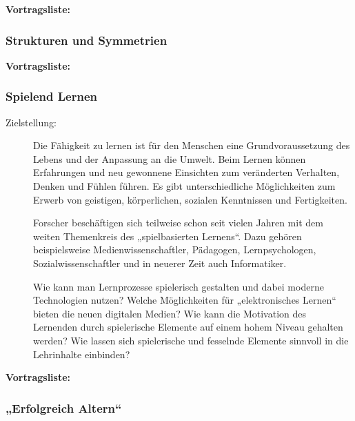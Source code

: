 \documentclass[%
a4paper, %
11pt,               %
leqno,              %
fleqn,              %
]
{scrartcl}
\begin{document}
\textsf{\textbf{Vortragsliste:}}


\subsubsection{Strukturen und Symmetrien} %
\label{ssub:Strukturen und Symmetrien}

\textsf{\textbf{Vortragsliste:}}


\subsubsection{Spielend Lernen} %
\label{ssub:Spielend Lernen}

\begin{description}
  \item[Zielstellung:] Die Fähigkeit zu lernen ist für den Menschen eine
    Grundvoraussetzung des Lebens und der Anpassung an die Umwelt. Beim Lernen
    können Erfahrungen und neu gewonnene Einsichten zum veränderten Verhalten,
    Denken und Fühlen führen. Es gibt unterschiedliche Möglichkeiten zum Erwerb
    von geistigen, körperlichen, sozialen Kenntnissen und Fertigkeiten. 

    Forscher beschäftigen sich teilweise schon seit vielen Jahren mit dem weiten
    Themenkreis des „spielbasierten Lernens“. Dazu gehören beispielsweise
    Medienwissenschaftler, Pädagogen, Lernpsychologen, Sozialwissenschaftler und
    in neuerer Zeit auch Informatiker.

    Wie kann man Lernprozesse spielerisch gestalten und dabei moderne
    Technologien nutzen? Welche Möglichkeiten für „elektronisches Lernen“
    bieten die neuen digitalen Medien? Wie kann die Motivation des Lernenden
    durch spielerische Elemente auf einem hohem Niveau gehalten werden? Wie
    lassen sich spielerische und fesselnde Elemente sinnvoll in die Lehrinhalte
    einbinden?
\end{description}

\textsf{\textbf{Vortragsliste:}}


\subsubsection{„Erfolgreich Altern“} %
\label{ssub:„Erfolgreich Altern“}
\end{document}
